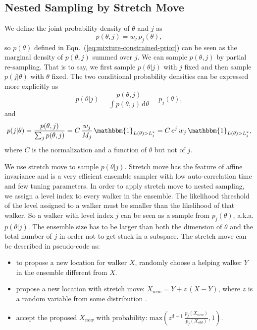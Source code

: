 \documentclass[letterpaper, preprint]{aastex}
\begin{document}
\subsection{Nested Sampling by Stretch Move}
\label{sec:algorithm}
We define the joint probability density of $\theta$ and $j$ as
\begin{equation}
p(\theta,j) = w_j\,p_j(\theta),
\label{eq:joint}
\end{equation} 
so $p(\theta)$ defined in Eqn.~(\ref{eq:mixture-constrained-prior}) can be seen as the marginal density of $p(\theta,j)$ summed over $j$. We can sample $p(\theta,j)$ by partial re-sampling. That is to say, we first sample $p(\theta|j)$ with $j$ fixed and then sample $p(j|\theta)$ with $\theta$ fixed. The two conditional probability densities can be expressed more explicitly as
\begin{equation}
p(\theta|j)=\frac{p(\theta,j)}{\int p(\theta,j)\,\mathrm{d}\theta}=p_j(\theta),
\end{equation}
and
\begin{equation}
p(j|\theta)=\frac{p(\theta,j)}{\sum_j p(\theta,j)}=C\,\frac{w_j}{M_j}\,\mathbbm{1}_{L(\theta)>L_j^*}=C\,e^j\,w_j\,\mathbbm{1}_{L(\theta)>L_j^*},
\label{eq:conditional-j}
\end{equation}
where $C$ is the normalization and a function of $\theta$ but not of $j$.

We use stretch move to sample $p(\theta|j)$. Stretch move has the feature of affine invariance and is a very efficient ensemble sampler with low auto-correlation time and few tuning parameters. \citep{goodman10a} In order to apply stretch move to nested sampling, we assign a level index to every walker in the ensemble. The likelihood threshold of the level assigned to a walker must be smaller than the likelihood of that walker. So a walker with level index $j$ can be seen as a sample from $p_j(\theta)$, a.k.a. $p(\theta|j)$. The ensemble size has to be larger than both the dimension of $\theta$ and the total number of $j$ in order not to get stuck in a subspace. The stretch move can be described in pseudo-code as:
\begin{sffamily}
\begin{itemize}
\item to propose a new location for walker $X$, randomly choose a helping walker $Y$ in the ensemble different from $X$.
\item propose a new location with stretch move: $X_{new} = Y + z\, (X-Y)$, where $z$ is a random variable from some distribution \citep{goodman10a}.
\item accept the proposed $X_{new}$ with probability: $\mathrm{max}\left(z^{\mathrm{d}-1}\,\frac{p_{j}(X_{new})}{p_{j}(X_{old})},1\right)$. 
\end{itemize}
\end{sffamily}
\end{document}

